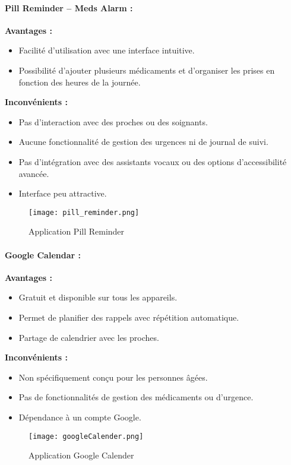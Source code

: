 \documentclass[12pt,a4paper]{report}
\begin{document}
\paragraph{Pill Reminder – Meds Alarm :}

\textbf{Avantages :}
\begin{itemize}
    \item Facilité d’utilisation avec une interface intuitive.
    \item Possibilité d’ajouter plusieurs médicaments et d’organiser les prises en fonction des heures de la journée.
\end{itemize}

\textbf{Inconvénients :}
\begin{itemize}
    \item Pas d’interaction avec des proches ou des soignants.
    \item Aucune fonctionnalité de gestion des urgences ni de journal de suivi.
    \item Pas d’intégration avec des assistants vocaux ou des options d’accessibilité avancée.
    \item Interface peu attractive.
\end{itemize}
\begin{figure}[H] 
    \centering
    \texttt{[image: pill\_reminder.png]}
    \caption{Application Pill Reminder}
    \label{fig:pillreminder}
\end{figure}
\paragraph{Google Calendar :}

\textbf{Avantages :}
\begin{itemize}
    \item Gratuit et disponible sur tous les appareils.
    \item Permet de planifier des rappels avec répétition automatique.
    \item Partage de calendrier avec les proches.
\end{itemize}

\textbf{Inconvénients :}
\begin{itemize}
    \item Non spécifiquement conçu pour les personnes âgées.
    \item Pas de fonctionnalités de gestion des médicaments ou d’urgence.
    \item Dépendance à un compte Google.
\end{itemize}
\begin{figure}[H] 
    \centering
    \texttt{[image: googleCalender.png]}
    \caption{Application Google Calender}
    \label{fig:googleCalender}
\end{figure}
\end{document}
